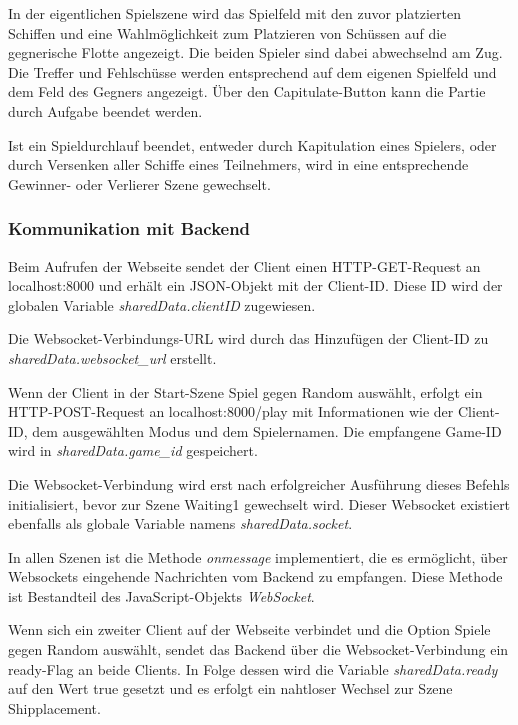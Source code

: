 \documentclass[a4paper, 10pt, conference]{IEEEtran}
\begin{document}
In der eigentlichen Spielszene wird das Spielfeld mit den zuvor platzierten Schiffen und eine Wahlmöglichkeit zum Platzieren von Schüssen auf die gegnerische Flotte angezeigt. Die beiden Spieler sind dabei abwechselnd am Zug. Die Treffer und Fehlschüsse werden entsprechend auf dem eigenen Spielfeld und dem Feld des Gegners angezeigt. Über den Capitulate-Button kann die Partie durch Aufgabe beendet werden. 

Ist ein Spieldurchlauf beendet, entweder durch Kapitulation eines Spielers, oder durch Versenken aller Schiffe eines Teilnehmers, wird in eine entsprechende Gewinner- oder Verlierer Szene gewechselt.




\subsubsection{Kommunikation mit Backend}\label{subsec:comwithbackend}

Beim Aufrufen der Webseite sendet der Client einen HTTP-GET-Request an \glqq localhost:8000\grqq{} und erhält ein JSON-Objekt mit der Client-ID. Diese ID wird der globalen Variable \textit{sharedData.clientID} zugewiesen.

Die Websocket-Verbindungs-URL wird durch das Hinzufügen der Client-ID zu \textit{sharedData.websocket\_url} erstellt.

Wenn der Client in der Start-Szene \glqq Spiel gegen Random\grqq{} auswählt, erfolgt ein HTTP-POST-Request an \glqq localhost:8000/play\grqq{} mit Informationen wie der Client-ID, dem ausgewählten Modus und dem Spielernamen. Die empfangene Game-ID wird in \textit{sharedData.game\_id} gespeichert.

Die Websocket-Verbindung wird erst nach erfolgreicher Ausführung dieses Befehls initialisiert, bevor zur Szene \glqq Waiting1\grqq{} gewechselt wird. Dieser Websocket existiert ebenfalls als globale Variable namens \textit{sharedData.socket}.

In allen Szenen ist die Methode \textit{onmessage} implementiert, die es ermöglicht, über Websockets eingehende Nachrichten vom Backend zu empfangen. Diese Methode ist Bestandteil des JavaScript-Objekts \textit{WebSocket}.

Wenn sich ein zweiter Client auf der Webseite verbindet und die Option \glqq Spiele gegen Random\grqq{} auswählt, sendet das Backend über die Websocket-Verbindung ein \glqq ready\grqq{}-Flag an beide Clients. In Folge dessen wird die Variable \textit{sharedData.ready} auf den Wert \glqq true\grqq{} gesetzt und es erfolgt ein nahtloser Wechsel zur Szene \glqq Shipplacement\grqq{}.
\end{document}
